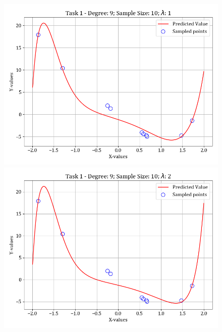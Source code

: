 \documentclass[12pt,a4paper]{article}
\begin{document}
\begin{figure}[H]
    \vspace{-2em}
    \hspace{-2em}
    \includegraphics[scale=0.45]{images/t1_d1/d_9_size_10_l_1.png}
    \includegraphics[scale=0.45]{images/t1_d1/d_9_size_10_l_2.png}
\end{figure}
\end{document}
